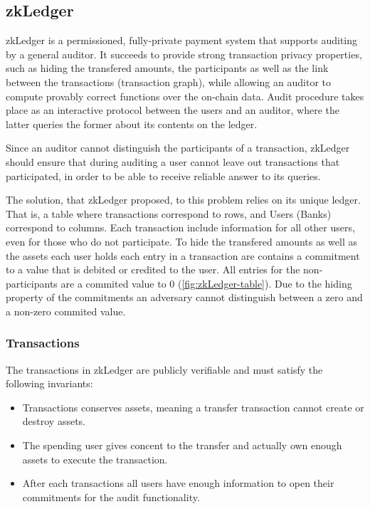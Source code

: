 \subsection{zkLedger}
zkLedger \cite{zkLedger} is a permissioned, fully-private payment system that supports auditing by a general auditor. It succeeds to provide strong transaction privacy properties, such as hiding the transfered amounts, the participants as well as the link between the transactions (transaction graph), while allowing an auditor to compute provably correct functions over the on-chain data. Audit procedure takes place as an interactive protocol between the users and an auditor, where the latter queries the former about its contents on the ledger. 

Since an auditor cannot distinguish the participants of a transaction, zkLedger should ensure that during auditing a user cannot leave out transactions that participated, in order to be able to receive reliable answer to its queries.

The solution, that zkLedger proposed, to this problem relies on its unique ledger. That is, a table where transactions correspond to rows, and Users (Banks) correspond to columns. Each transaction include information for all other users, even for those who do not participate. To hide the transfered amounts as well as the assets each user holds each entry in a transaction are contains a commitment to a value that is debited or credited to the user. All entries for the non-participants are a commited value to 0 (\autoref{fig:zkLedger-table}). Due to the hiding property of the commitments an adversary cannot distinguish between a zero and a non-zero commited value.

\subsubsection{Transactions}
The transactions in zkLedger are publicly verifiable and must satisfy the following invariants:
\begin{itemize}
    \item Transactions conserves assets, meaning a transfer transaction cannot create or destroy assets.
    \item The spending user gives concent to the transfer and actually own enough assets to execute the transaction.
    \item After each transactions all users have enough information to open their commitments for the audit functionality.
\end{itemize}

